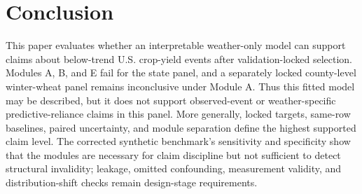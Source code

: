 \documentclass[conference]{IEEEtran}
\begin{document}
\section{Conclusion}
This paper evaluates whether an interpretable weather-only model can support
claims about below-trend U.S. crop-yield events after validation-locked selection.
Modules A, B, and E fail for the state panel, and a separately locked county-level
winter-wheat panel remains inconclusive under Module A. Thus this fitted model
may be described, but it does not support observed-event or weather-specific
predictive-reliance claims in this panel. More generally, locked targets,
same-row baselines, paired uncertainty, and module separation define the highest
supported claim level. The corrected synthetic benchmark's
\SyntheticPolicySensitivity{} sensitivity and \SyntheticPolicySpecificity{}
specificity show that the modules are necessary for claim discipline but not
sufficient to detect structural invalidity; leakage, omitted confounding,
measurement validity, and distribution-shift checks remain design-stage
requirements.



\end{document}
